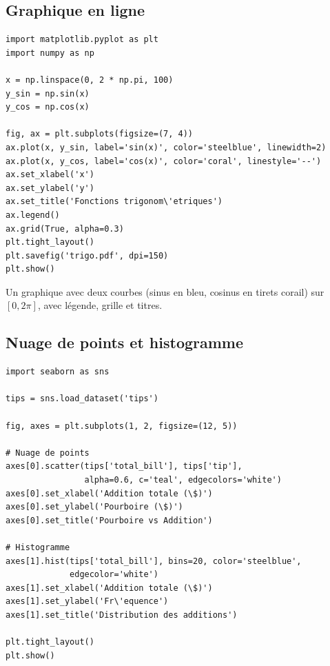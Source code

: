 \subsection{Graphique en ligne}

\begin{codeblock}[title=\textbf{Python}]
\begin{verbatim}
import matplotlib.pyplot as plt
import numpy as np

x = np.linspace(0, 2 * np.pi, 100)
y_sin = np.sin(x)
y_cos = np.cos(x)

fig, ax = plt.subplots(figsize=(7, 4))
ax.plot(x, y_sin, label='sin(x)', color='steelblue', linewidth=2)
ax.plot(x, y_cos, label='cos(x)', color='coral', linestyle='--')
ax.set_xlabel('x')
ax.set_ylabel('y')
ax.set_title('Fonctions trigonom\'etriques')
ax.legend()
ax.grid(True, alpha=0.3)
plt.tight_layout()
plt.savefig('trigo.pdf', dpi=150)
plt.show()
\end{verbatim}
\end{codeblock}

\begin{codeoutput}
Un graphique avec deux courbes (sinus en bleu, cosinus en tirets corail) sur $[0, 2\pi]$, avec l\'egende, grille et titres.
\end{codeoutput}

\subsection{Nuage de points et histogramme}

\begin{codeblock}[title=\textbf{Python}]
\begin{verbatim}
import seaborn as sns

tips = sns.load_dataset('tips')

fig, axes = plt.subplots(1, 2, figsize=(12, 5))

# Nuage de points
axes[0].scatter(tips['total_bill'], tips['tip'],
                alpha=0.6, c='teal', edgecolors='white')
axes[0].set_xlabel('Addition totale (\$)')
axes[0].set_ylabel('Pourboire (\$)')
axes[0].set_title('Pourboire vs Addition')

# Histogramme
axes[1].hist(tips['total_bill'], bins=20, color='steelblue',
             edgecolor='white')
axes[1].set_xlabel('Addition totale (\$)')
axes[1].set_ylabel('Fr\'equence')
axes[1].set_title('Distribution des additions')

plt.tight_layout()
plt.show()
\end{verbatim}
\end{codeblock}

